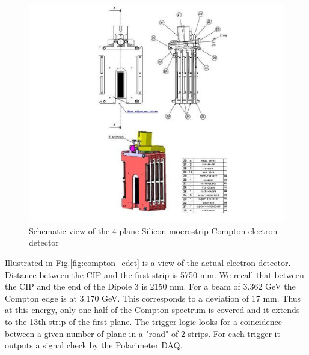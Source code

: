 \begin{figure}[htp]
    \begin{center}
        \includegraphics*[angle=0,scale=1]{compton_edet_strips_cad}
    \end{center}
    \caption[compton:electron detector]{Schematic view of the 4-plane Silicon-mocrostrip Compton electron detector}
    \label{fig:compton_edet_strips_cad}
 \end{figure}


 Illustrated in Fig.\ref{fig:compton_edet} is a view of the actual electron detector.
Distance between the CIP and the first strip is 5750 mm. We recall that
between the CIP and the end of the Dipole 3 is 2150 mm.
For a beam of 3.362 GeV the Compton
edge is at 3.170 GeV. This corresponds to a deviation of 17 mm. Thus at
this energy, only one half of the Compton spectrum is covered and it extends
to the 13th strip of the first plane. The trigger logic looks for a coincidence
between a given number of plane in a "road" of 2 strips. For each trigger
it outputs a signal check by the Polarimeter DAQ.


